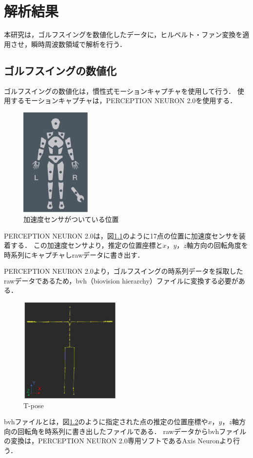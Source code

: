 \chapter{解析結果}
本研究は，ゴルフスイングを数値化したデータに，ヒルベルト・ファン変換を適用させ，瞬時周波数領域で解析を行う．
\section{ゴルフスイングの数値化}
ゴルフスイングの数値化は，慣性式モーションキャプチャを使用して行う．
使用するモーションキャプチャは，PERCEPTION NEURON 2.0を使用する．
\begin{figure}
    \begin{center}
        \includegraphics[width=3.5cm]{./images/sensors.png}
        \caption{加速度センサがついている位置}
        \label{sensors}
    \end{center}
\end{figure}
PERCEPTION NEURON 2.0は，図\ref{sensors}のように17点の位置に加速度センサを装着する．
この加速度センサより，推定の位置座標と$x$，$y$，$z$軸方向の回転角度を時系列にキャプチャしrawデータに書き出す．

PERCEPTION NEURON 2.0より，ゴルフスイングの時系列データを採取したrawデータであるため，bvh（biovision hierarchy）ファイルに変換する必要がある．
\begin{figure}
    \begin{center}
        \includegraphics[width=5cm]{./images/Tpose.png}
        \caption{T-pose}
        \label{tpose}
    \end{center}
\end{figure}
bvhファイルとは，図\ref{tpose}のように指定された点の推定の位置座標や$x$，$y$，$z$軸方向の回転角を時系列に書き出したファイルである．
rawデータからbvhファイルの変換は，PERCEPTION NEURON 2.0専用ソフトであるAxis Neuronより行う．


